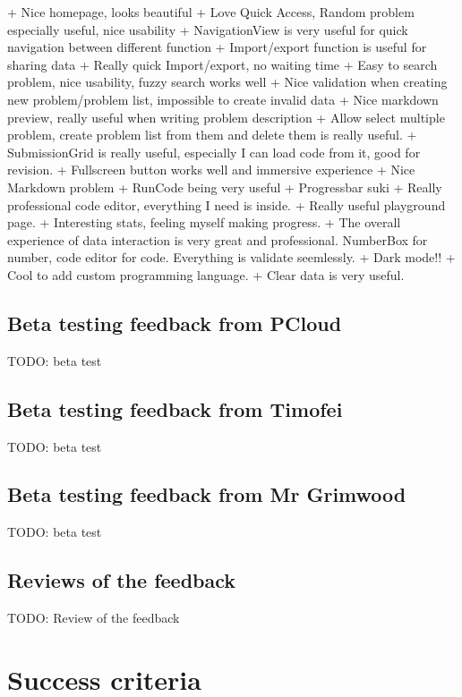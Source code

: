\documentclass[a4paper]{report}
\begin{document}
+ Nice homepage, looks beautiful
+ Love Quick Access, Random problem especially useful, nice usability
+ NavigationView is very useful for quick navigation between different function
+ Import/export function is useful for sharing data
+ Really quick Import/export, no waiting time
+ Easy to search problem, nice usability, fuzzy search works well
+ Nice validation when creating new problem/problem list, impossible to create invalid data
+ Nice markdown preview, really useful when writing problem description
+ Allow select multiple problem, create problem list from them and delete them is really useful.
+ SubmissionGrid is really useful, especially I can load code from it, good for revision.
+ Fullscreen button works well and immersive experience
+ Nice Markdown problem
+ RunCode being very useful
+ Progressbar suki
+ Really professional code editor, everything I need is inside.
+ Really useful playground page.
+ Interesting stats, feeling myself making progress.
+ The overall experience of data interaction is very great and professional. NumberBox for number, code editor for code. Everything is validate seemlessly.
+ Dark mode!!
+ Cool to add custom programming language.
+ Clear data is very useful.

\subsection{Beta testing feedback from PCloud}

TODO: beta test

\subsection{Beta testing feedback from Timofei}

TODO: beta test
\subsection{Beta testing feedback from Mr Grimwood}

TODO: beta test

\subsection{Reviews of the feedback}

TODO: Review of the feedback

\section{Success criteria}
\end{document}
